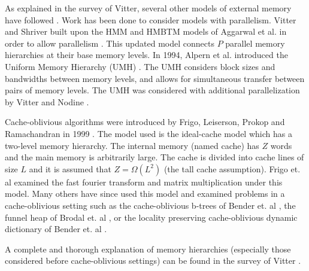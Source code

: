 \documentclass[letterpaper,12pt,titlepage,oneside,final]{book}
\theoremstyle{plain}
\begin{document}
\iffalse
In Chapter~\ref{Approximate Binary Search in the Hierarchical Memory with Block Transfer Model} we examine the same optimum binary search tree problem but under the extended Hierarchical Memory with Block Transfer Model of Aggarwal, Chandra, and Snir \cite{aggarwal1987hierarchical}. This model extends the previous model, proving a slightly less artificial setting by allowing for contiguous blocks of memory to be copied from one location to another for a cheaper price. The cost of this copy equal to the cost to access the most expensive location being copied, (to or from) plus the size of the block. \\

\fi

As explained in the survey of Vitter, several other models of external memory have followed \cite{vitter2001external}. Work has been done to consider models with parallelism. Vitter and Shriver built upon the HMM and HMBTM models of Aggarwal et al. \cite{aggarwal1987model, aggarwal1987hierarchical} in order to allow parallelism \cite{vitter1994algorithms}. This updated model connects $P$ parallel memory hierarchies at their base memory levels. In 1994, Alpern et al. introduced the Uniform Memory Hierarchy (UMH) \cite{alpern1994uniform}. The UMH considers block sizes and bandwidths between memory levels, and allows for simultaneous transfer between pairs of memory levels. The UMH was considered with additional parallelization by Vitter and Nodine \cite{vitter1993large}.


Cache-oblivious algorithms were introduced by Frigo, Leiserson, Prokop and Ramachandran in 1999 \cite{frigo1999cache}. The model used is the ideal-cache model which has a two-level memory hierarchy. The internal memory (named cache) has $Z$ words and the main memory is arbitrarily large. The cache is divided into cache lines of size $L$ and it is assumed that $Z=\Omega(L^2)$ (the tall cache assumption). Frigo et. al examined the fast fourier transform and matrix multiplication under this model. Many others have since used this model and examined problems in a cache-oblivious setting such as the cache-oblivious b-trees of Bender et. al \cite{bender2000cache}, the funnel heap of Brodal et. al \cite{brodai2002funnel}, or the locality preserving cache-oblivious dynamic dictionary of Bender et. al \cite{bender2002locality}.

A complete and thorough explanation of memory hierarchies (especially those considered before cache-oblivious settings) can be found in the survey of Vitter \cite{vitter2001external}.
\end{document}
